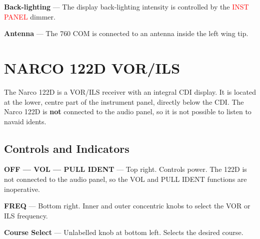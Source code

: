 \textbf{Back-lighting} --- The display back-lighting intensity is controlled by the \textcolor{red}{INST PANEL} dimmer.

\textbf{Antenna} --- The 760 COM is connected to an antenna inside the left wing tip. 

\section{NARCO 122D VOR/ILS}


The Narco 122D is a VOR/ILS receiver with an integral CDI display. It is located at the lower, centre part of the instrument panel, directly below the CDI. The Narco 122D is \textbf{not} connected to the audio panel, so it is not possible to listen to navaid idents. 

\subsection*{Controls and Indicators}

\textbf{OFF --- VOL --- PULL IDENT} --- Top right. Controls power. The 122D is not connected to the audio panel, so the VOL and PULL IDENT functions are inoperative.

\textbf{FREQ} --- Bottom right. Inner and outer concentric knobs to select the VOR or ILS frequency.

\textbf{Course Select} --- Unlabelled knob at bottom left. Selects the desired course.

